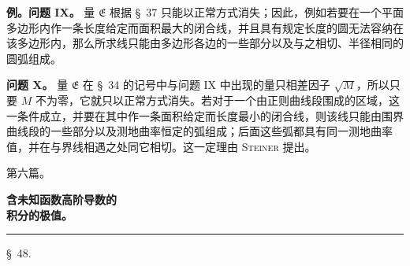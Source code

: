 \documentclass[11pt,a4paper,leqno]{article}
\begin{document}
\textbf{例。问题 IX。} 量 $\mathfrak E$ 根据 \S~37 只能以正常方式消失；因此，例如若要在一个平面多边形内作一条长度给定而面积最大的闭合线，并且具有规定长度的圆无法容纳在该多边形内，那么所求线只能由多边形各边的一些部分以及与之相切、半径相同的圆弧组成。

\textbf{问题 X。} 量 $\mathfrak E$ 在 \S~34 的记号中与问题 IX 中出现的量只相差因子 $\sqrt M$，所以只要 $M$ 不为零，它就只以正常方式消失。若对于一个由正则曲线段围成的区域，这一条件成立，并要在其中作一条面积给定而长度最小的闭合线，则该线只能由围界曲线段的一些部分以及测地曲率恒定的弧组成；后面这些弧都具有同一测地曲率值，并在与界线相遇之处同它相切。这一定理由 \textsc{Steiner} 提出。

\begin{center}
{\large 第六篇。}\par
\vspace{2mm}
{\Large\bfseries 含未知函数高阶导数的\\积分的极值。}\par
\vspace{2mm}\rule{32mm}{0.4pt}\par
\vspace{2mm}
{\large \S~48.}
\end{center}
\end{document}
